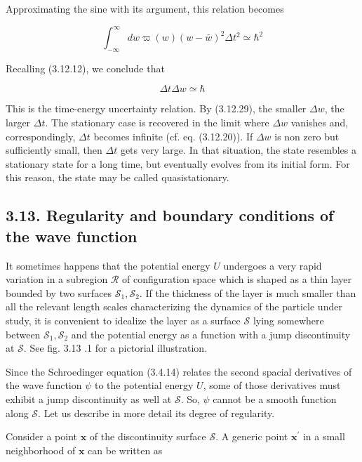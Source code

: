 \documentclass{article}
\begin{document}
Approximating the sine with its argument, this relation becomes
 
\begin{equation*}
\int_{-\infty}^{\infty} d w \varpi(w)(w-\bar{w})^{2} \Delta t^{2} \simeq \hbar^{2} \tag{3.12.28}
\end{equation*}
 

Recalling (3.12.12), we conclude that
 
\begin{equation*}
\Delta t \Delta w \simeq \hbar \tag{3.12.29}
\end{equation*}
 

This is the time-energy uncertainty relation. By (3.12.29), the smaller $\Delta w$, the larger $\Delta t$. The stationary case is recovered in the limit where $\Delta w$ vanishes and, correspondingly, $\Delta t$ becomes infinite (cf. eq. (3.12.20)). If $\Delta w$ is non zero but sufficiently small, then $\Delta t$ gets very large. In that situation, the state resembles a stationary state for a long time, but eventually evolves from its initial form. For this reason, the state may be called quasistationary.

\subsection*{3.13. Regularity and boundary conditions of the wave function}

It sometimes happens that the potential energy $U$ undergoes a very rapid variation in a subregion $\mathcal{R}$ of configuration space which is shaped as a thin layer bounded by two surfaces $\mathcal{S}_{1}, \mathcal{S}_{2}$. If the thickness of the layer is much smaller than all the relevant length scales characterizing the dynamics of the particle under study, it is convenient to idealize the layer as a surface $\mathcal{S}$ lying somewhere between $\mathcal{S}_{1}, \mathcal{S}_{2}$ and the potential energy as a function with a jump discontinuity at $\mathcal{S}$. See fig. 3.13 .1 for a pictorial illustration.

Since the Schroedinger equation (3.4.14) relates the second spacial derivatives of the wave function $\psi$ to the potential energy $U$, some of those derivatives must exhibit a jump discontinuity as well at $\mathcal{S}$. So, $\psi$ cannot be a smooth function along $\mathcal{S}$. Let us describe in more detail its degree of regularity.

Consider a point $\boldsymbol{x}$ of the discontinuity surface $\mathcal{S}$. A generic point $\boldsymbol{x}^{\prime}$ in a small neighborhood of $\boldsymbol{x}$ can be written as
 
\end{document}
